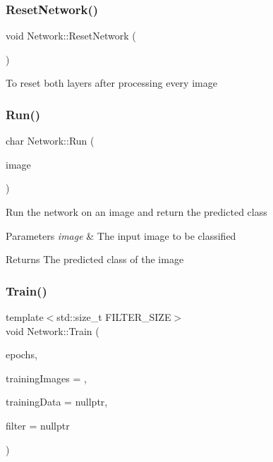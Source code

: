 \subsubsection{\texorpdfstring{Reset\+Network()}{ResetNetwork()}}
{\footnotesize\ttfamily void Network\+::\+Reset\+Network (\begin{DoxyParamCaption}{ }\end{DoxyParamCaption})\hspace{0.3cm}{\ttfamily [protected]}}

To reset both layers after processing every image \mbox{\label{class_network_aeafe392ced0c5ec00c8f09ad9300f14d}} 
\subsubsection{\texorpdfstring{Run()}{Run()}}
{\footnotesize\ttfamily char Network\+::\+Run (\begin{DoxyParamCaption}\item[{array$<$ unsigned char, \mbox{\hyperlink{_constants_8h_aefc2426e4681da445c7793c98a83c532}{N\+E\+U\+R\+O\+N\+S\+\_\+\+IN}} $>$}]{image }\end{DoxyParamCaption})}

Run the network on an image and return the predicted class 
\begin{DoxyParams}{Parameters}
{\em image} & The input image to be classified \\
\hline
\end{DoxyParams}
\begin{DoxyReturn}{Returns}
The predicted class of the image 
\end{DoxyReturn}
\mbox{\label{class_network_a22a9a612294363126d5fe95ba5a7c025}} 
\subsubsection{\texorpdfstring{Train()}{Train()}}
{\footnotesize\ttfamily template$<$std\+::size\+\_\+t F\+I\+L\+T\+E\+R\+\_\+\+S\+I\+ZE$>$ \\
void Network\+::\+Train (\begin{DoxyParamCaption}\item[{short}]{epochs,  }\item[{int}]{training\+Images = {},  }\item[{vector$<$ pair$<$ array$<$ unsigned char, \mbox{\hyperlink{_constants_8h_aefc2426e4681da445c7793c98a83c532}{N\+E\+U\+R\+O\+N\+S\+\_\+\+IN}} $>$, unsigned char $>$$>$ $\ast$}]{training\+Data = {\ttfamily nullptr},  }\item[{array$<$ unsigned char, F\+I\+L\+T\+E\+R\+\_\+\+S\+I\+ZE $>$ $\ast$}]{filter = {\ttfamily nullptr} }\end{DoxyParamCaption})}

